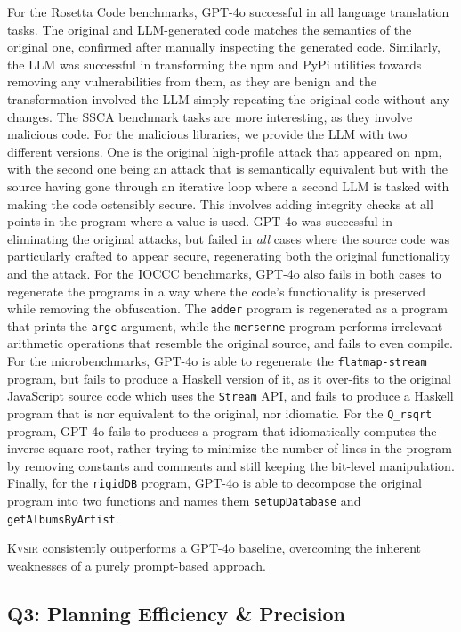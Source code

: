 \documentclass[nonacm,sigplan,review]{acmart}
\def\gptmodel{{GPT-4o}\xspace}
\newcommand{\sys}{{\scshape Kv{\textalpha}sir}\xspace}
\newcommand{\ttt}[1]{\texttt{#1}\xspace}
\begin{document}
For the Rosetta Code benchmarks, \gptmodel 
successful in all language translation tasks.
The original and LLM-generated code matches the semantics
of the original one, confirmed after manually inspecting the generated code.
Similarly, the LLM was successful in transforming the npm and PyPi utilities towards
removing any vulnerabilities from them, as they are benign and the transformation
involved the LLM simply repeating the original code without any changes.
The SSCA benchmark tasks are more interesting, as they involve 
malicious code. For the malicious libraries, we provide the LLM 
with two different versions. One is the original high-profile attack that appeared on npm,
with the second one being an attack that is semantically equivalent but with the source 
having gone through an iterative loop where a second LLM is tasked with making the code ostensibly 
secure. This involves adding integrity checks at all points in the program where a value is used.
\gptmodel was successful in eliminating the original attacks, but failed in \emph{all} 
cases where the source code was particularly crafted to appear secure, regenerating both 
the original functionality and the attack.
For the IOCCC benchmarks, \gptmodel also fails 
in both cases to regenerate the programs in a way where the code's 
functionality is preserved while removing the obfuscation.
The \ttt{adder} program is regenerated as a program that prints the \ttt{argc} argument, 
while the \ttt{mersenne} program performs irrelevant arithmetic operations that 
resemble the original source, and fails to even compile.
For the microbenchmarks, \gptmodel is able to regenerate the \ttt{flatmap-stream} program, but fails to produce a Haskell version of it,
as it over-fits to the original JavaScript source code which uses the \ttt{Stream} API,
and fails to produce a Haskell program that is nor equivalent to the original, nor idiomatic.
For the \ttt{Q\_rsqrt} program, \gptmodel fails to produces a program that idiomatically 
computes the inverse square root, rather trying to minimize the number of lines in the program
by removing constants and comments and still keeping the bit-level manipulation.
Finally, for the \ttt{rigidDB} program, \gptmodel is able to decompose the original program into two functions
and names them \ttt{setupDatabase} and \ttt{getAlbumsByArtist}.

\sys consistently outperforms a \gptmodel baseline,
overcoming the inherent weaknesses of a purely prompt-based approach.

\subsection{Q3: Planning Efficiency \& Precision}
\end{document}
